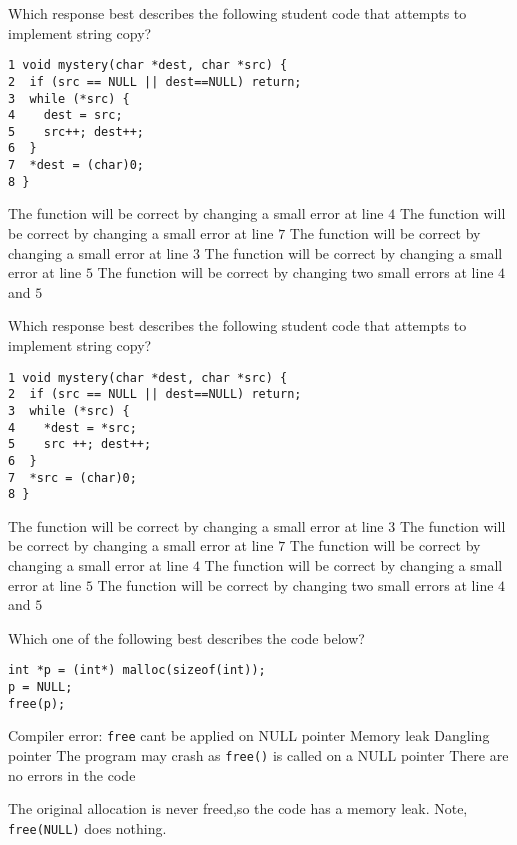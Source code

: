 \variant
Which response best describes the following student code that attempts to implement string copy?
\begin{verbatim}
1 void mystery(char *dest, char *src) {
2  if (src == NULL || dest==NULL) return;
3  while (*src) { 
4    dest = src; 
5    src++; dest++;
6  } 
7  *dest = (char)0;
8 }
\end{verbatim}
\begin{answers}
\correctanswer  The function will be correct by changing a small error at line $4$
\answer  The function will be correct by changing a small error at line $7$
\answer  The function will be correct by changing a small error at line $3$
\answer  The function will be correct by changing a small error at line $5$
\answer  The function will be correct by changing two small errors at line $4$ and $5$
\end{answers}
\begin{solution}
\end{solution}

\variant
Which response best describes the following student code that attempts to implement string copy?
\begin{verbatim}
1 void mystery(char *dest, char *src) {
2  if (src == NULL || dest==NULL) return;
3  while (*src) { 
4    *dest = *src; 
5    src ++; dest++;
6  } 
7  *src = (char)0;
8 }
\end{verbatim}
\begin{answers}
\answer  The function will be correct by changing a small error at line $3$
\correctanswer   The function will be correct by changing a small error at line $7$
\answer  The function will be correct by changing a small error at line $4$
\answer  The function will be correct by changing a small error at line $5$
\answer  The function will be correct by changing two small errors at line $4$ and $5$
\end{answers}
\begin{solution}
\end{solution}




\variant
Which one of the following best describes the code below?
\begin{verbatim}
int *p = (int*) malloc(sizeof(int));
p = NULL;
free(p);
\end{verbatim}
\begin{answers}
\answer Compiler error: {\tt free} cant be applied on NULL pointer
\correctanswer Memory leak
\answer Dangling pointer
\answer The program may crash as {\tt free()} is called on a NULL pointer
\answer There are no errors in the code
\end{answers}
\begin{solution}
The original allocation is never freed,so the code has a memory leak. Note, {\tt free(NULL)} does nothing. 
\end{solution}


